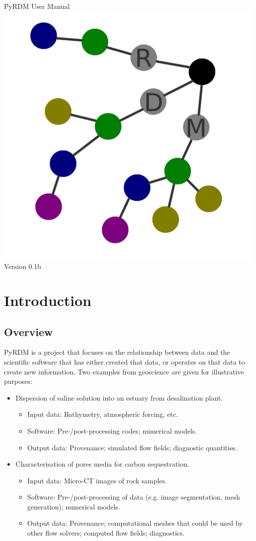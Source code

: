 \documentclass[a4paper,11pt]{report}
\begin{document}
\begin{titlepage}
\begin{center}
\vspace*{3cm}
\huge{PyRDM User Manual}\\\vspace*{2cm}
\includegraphics[width=0.4\columnwidth]{images/rdm.png}\\\vspace*{2cm}
\LARGE{Version 0.1b}

\end{center}
\end{titlepage}

\tableofcontents

\chapter{Introduction}\label{chap:introduction}
\section{Overview}
PyRDM is a project that focuses on the relationship between data and the scientific software that has either created that data, or operates on that data to create new information. Two examples from geoscience are given for illustrative purposes:
\begin{itemize}
  \item Dispersion of saline solution into an estuary from desalination plant.
  \begin{itemize}
    \item Input data: Bathymetry, atmospheric forcing, etc.
    \item Software: Pre-/post-processing codes; numerical models.
    \item Output data: Provenance; simulated flow fields; diagnostic quantities.
  \end{itemize}
  \item Characterisation of pores media for carbon sequestration.
  \begin{itemize}
    \item Input data: Micro-CT images of rock samples.
    \item Software: Pre-/post-processing of data (e.g. image segmentation, mesh generation); numerical models.
    \item Output data: Provenance; computational meshes that could be used by other flow solvers; computed flow fields; diagnostics.
  \end{itemize}
\end{itemize}
\end{document}
